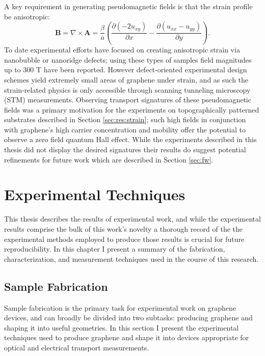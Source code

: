 \documentclass[edeposit,fullpage,draftthesis]{uiucthesis2009}
\begin{document}
        A key requirement in generating pseudomagnetic fields is that the strain profile be anisotropic: 
        \begin{equation}
            \textbf{B} = \nabla \times \textbf{A} = \frac{\beta}{a} \left( \frac{\partial (-2 u_{xy})}{\partial x} - \frac{\partial (u_{xx} - u_{yy})}{\partial y} \right).
        \end{equation}
        To date experimental efforts have focused on creating anisotropic strain via nanobubble \cite{Levy2010} 
        or nanoridge \cite{Yan2012} defects; using these types of samples field magnitudes up to 
        300 T have been reported. However defect-oriented experimental design
        schemes yield extremely small areas of graphene under strain, and as such the 
        strain-related physics is only accessible through scanning tunneling microscopy (STM) measurements. 
        Observing transport signatures of these pseudomagnetic fields was 
        a primary motivation for the experiments on topographically patterned substrates 
        described in Section \ref{sec:res:strain}; 
        such high fields in conjunction with graphene's high carrier concentration and mobility
        offer the potential to observe a zero field quantum Hall effect.
        While the experiments described in this thesis did not display the desired signatures their results do 
        suggest potential refinements for future work which are described in Section \ref{sec:fw}.



\chapter{Experimental Techniques}
\label{sec:ch:exptech}

    This thesis describes the results of experimental work, and while the experimental results comprise the bulk
    of this work's novelty a thorough record of the the experimental methods employed to produce those results 
    is crucial for future reproducibility.
    In this chapter I present a summary of the fabrication, characterization, and measurement techniques used
    in the course of this research.
    
    \section{Sample Fabrication}
    
        Sample fabrication is the primary task for experimental work on graphene devices, 
        and can broadly be divided into two subtasks: producing graphene and shaping it into useful geometries.
        In this section I present the experimental techniques used to produce graphene
        and shape it into devices appropriate for optical and electrical transport measurements.
    
\end{document}
